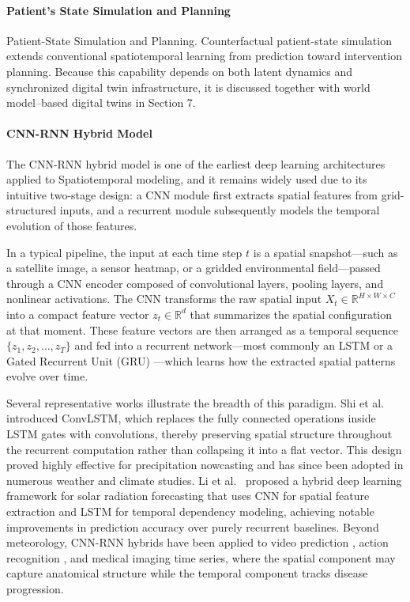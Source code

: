 \documentclass[acmsmall]{acmart}
\begin{document}
\paragraph{Patient's State Simulation and Planning}

Patient-State Simulation and Planning. Counterfactual patient-state simulation extends conventional spatiotemporal learning from prediction toward intervention planning. Because this capability depends on both latent dynamics and synchronized digital twin infrastructure, it is discussed together with world model–based digital twins in Section 7. 

\paragraph{CNN-RNN Hybrid Model}
The CNN-RNN hybrid model is one of the earliest deep learning architectures applied to Spatiotemporal modeling, and it remains widely used due to its intuitive two-stage design: a CNN module first extracts spatial features from grid-structured inputs, and a recurrent module subsequently models the temporal evolution of those features.
 
In a typical pipeline, the input at each time step $t$ is a spatial snapshot—such as a satellite image, a sensor heatmap, or a gridded environmental field—passed through a CNN encoder composed of convolutional layers, pooling layers, and nonlinear activations. The CNN transforms the raw spatial input $X_t \in \mathbb{R}^{H \times W \times C}$ into a compact feature vector $z_t \in \mathbb{R}^{d}$ that summarizes the spatial configuration at that moment. These feature vectors are then arranged as a temporal sequence $\{z_1, z_2, \ldots, z_T\}$ and fed into a recurrent network—most commonly an LSTM \cite{rnn_lstm} or a Gated Recurrent Unit (GRU) \cite{cho2014gru}—which learns how the extracted spatial patterns evolve over time.
 
Several representative works illustrate the breadth of this paradigm. Shi et al.~\cite{shi2015convolutional} introduced ConvLSTM, which replaces the fully connected operations inside LSTM gates with convolutions, thereby preserving spatial structure throughout the recurrent computation rather than collapsing it into a flat vector. This design proved highly effective for precipitation nowcasting and has since been adopted in numerous weather and climate studies. Li et al.~\cite{li2025solar} proposed a hybrid deep learning framework for solar radiation forecasting that uses CNN for spatial feature extraction and LSTM for temporal dependency modeling, achieving notable improvements in prediction accuracy over purely recurrent baselines. Beyond meteorology, CNN-RNN hybrids have been applied to video prediction \cite{srivastava2015unsupervised}, action recognition \cite{donahue2015longterm}, and medical imaging time series, where the spatial component may capture anatomical structure while the temporal component tracks disease progression.
 
\end{document}
